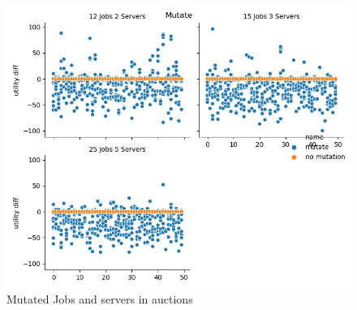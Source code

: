 \begin{figure}[H]
    \centering
    \includegraphics[width=1\linewidth]{./images/mutated_auction.png}
    \caption{Mutated Jobs and servers in auctions}
\end{figure}